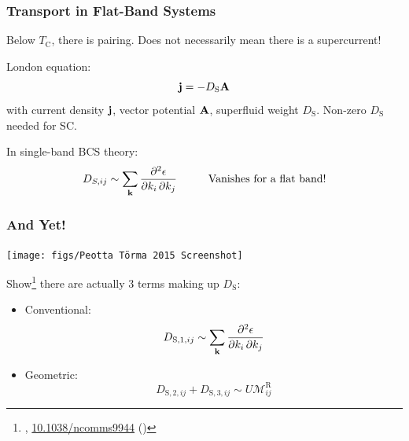 \documentclass[aspectratio=169]{beamer}
\begin{document}
\begin{frame}
	\frametitle{Transport in Flat-Band Systems}
	
	\begin{block}{}
		\begin{center}
			Below \(T_{\textrm{C}}\), there is pairing.
			Does not necessarily mean there is a supercurrent!
		\end{center}
	\end{block}\pause
	London equation:
	\begin{equation}
		\mathbf{j} = -D_{\textrm{S}} \mathbf{A}
	\end{equation}
	with current density \(\mathbf{j}\), vector potential \(\mathbf{A}\), superfluid weight \(D_{\textrm{S}}\).
	Non-zero \(D_{\textrm{S}}\) needed for SC.\pause
	
	In single-band BCS theory:
	\begin{equation}
		D_{S, ij} \sim \sum_{\mathbf{k}} \pdv{\epsilon}{k_i,k_j} \hspace{1cm} \text{Vanishes for a flat band!}
	\end{equation}
\end{frame}


\begin{frame}
	\frametitle{And Yet!}
	
	\begin{center}
		\texttt{[image: figs/Peotta Törma 2015 Screenshot]}
	\end{center}\pause
	
	Show\footnote<2->[frame]{\footnotesize \citeauthor{peottaSuperfluidityTopologicallyNontrivial2015}, \href{https://doi.org/10.1038/ncomms9944}{10.1038/ncomms9944} (\citeyear{peottaSuperfluidityTopologicallyNontrivial2015})} there are actually 3 terms making up \(D_{\textrm{S}}\):
	
	\begin{itemize}
		\item Conventional:
		\begin{equation}
			D_{\textrm{S}, 1, ij} \sim \sum_{\mathbf{k}} \pdv{\epsilon}{k_i,k_j}
		\end{equation}\pause
		\item Geometric: 
		\begin{equation}
			D_{\textrm{S}, 2, ij} + D_{\textrm{S}, 3, ij} \sim U \mathcal{M}_{ij}^{\textrm{R}}
		\end{equation}
	\end{itemize}
\end{frame}
\end{document}
